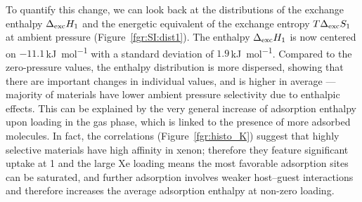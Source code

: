 \documentclass[main.tex]{subfiles}
\begin{document}
To quantify this change, we can look back at the distributions of the exchange enthalpy $\Delta_{\text{exc}}H_{\text{1}}$ and the energetic equivalent of the exchange entropy $T\Delta_{\text{exc}}S_{\text{1}}$ at ambient pressure (Figure~\ref{fgr:SI:dist1}). The enthalpy $\Delta_{\text{exc}}H_{\text{1}}$ is now centered on $-11.1$\,\si{\kilo\joule\per\mol} with a standard deviation of $1.9$\,\si{\kilo\joule\per\mol}. Compared to the zero-pressure values, the enthalpy distribution is more dispersed, showing that there are important changes in individual values, and is higher in average --- majority of materials have lower ambient pressure selectivity due to enthalpic effects. This can be explained by the very general increase of adsorption enthalpy upon loading in the gas phase, which is linked to the presence of more adsorbed molecules. In fact, the correlations (Figure~\ref{fgr:histo_K}) suggest that highly selective materials have high affinity in xenon; therefore they feature significant uptake at \SI{1}{\atm} and the large Xe loading means the most favorable adsorption sites can be saturated, and further adsorption involves weaker host--guest interactions and therefore increases the average adsorption enthalpy at non-zero loading.
\end{document}
